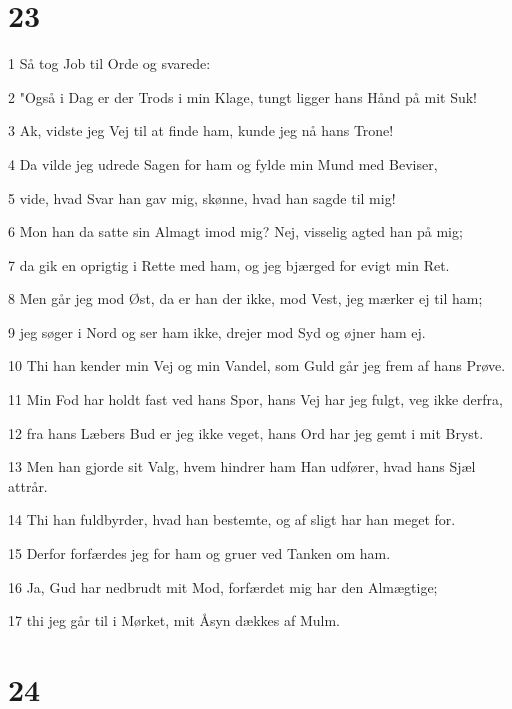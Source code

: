\chapter{23}

\par 1 Så tog Job til Orde og svarede:
\par 2 "Også i Dag er der Trods i min Klage, tungt ligger hans Hånd på mit Suk!
\par 3 Ak, vidste jeg Vej til at finde ham, kunde jeg nå hans Trone!
\par 4 Da vilde jeg udrede Sagen for ham og fylde min Mund med Beviser,
\par 5 vide, hvad Svar han gav mig, skønne, hvad han sagde til mig!
\par 6 Mon han da satte sin Almagt imod mig? Nej, visselig agted han på mig;
\par 7 da gik en oprigtig i Rette med ham, og jeg bjærged for evigt min Ret.
\par 8 Men går jeg mod Øst, da er han der ikke, mod Vest, jeg mærker ej til ham;
\par 9 jeg søger i Nord og ser ham ikke, drejer mod Syd og øjner ham ej.
\par 10 Thi han kender min Vej og min Vandel, som Guld går jeg frem af hans Prøve.
\par 11 Min Fod har holdt fast ved hans Spor, hans Vej har jeg fulgt, veg ikke derfra,
\par 12 fra hans Læbers Bud er jeg ikke veget, hans Ord har jeg gemt i mit Bryst.
\par 13 Men han gjorde sit Valg, hvem hindrer ham Han udfører, hvad hans Sjæl attrår.
\par 14 Thi han fuldbyrder, hvad han bestemte, og af sligt har han meget for.
\par 15 Derfor forfærdes jeg for ham og gruer ved Tanken om ham.
\par 16 Ja, Gud har nedbrudt mit Mod, forfærdet mig har den Almægtige;
\par 17 thi jeg går til i Mørket, mit Åsyn dækkes af Mulm.

\chapter{24}


